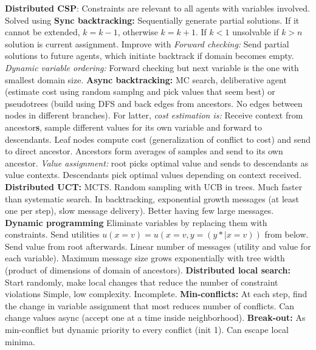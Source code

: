 \documentclass{article}
\newcommand{\disadv}[1]{{\color{red} #1}}
\newcommand{\adv}[1]{{\color{green!60!blue} #1}}
\begin{document}
\begin{multicols*}{4}
\textbf{Distributed CSP}: Constraints are relevant to all agents with variables involved. Solved using \textbf{Sync backtracking: }Sequentially generate partial solutions. If it cannot be extended, $k=k-1$, otherwise $k=k+1$. If $k<1$ unsolvable if $k>n$ solution is current assignment. Improve with \textit{Forward checking: }Send partial solutions to future agents, which initiate backtrack if domain becomes empty. \textit{Dynamic variable ordering: }Forward checking but next variable is the one with smallest domain size. \textbf{Async backtracking: }MC search, deliberative agent (estimate cost using random samplng and pick values that seem best) or pseudotrees (build using DFS and back edges from ancestors. No edges between nodes in different branches). For latter, \textit{cost estimation is: }Receive context from ancestor\textbf{s}, sample different values for its own variable and forward to descendants. Leaf nodes compute cost (generalization of conflict to cost) and send to direct ancestor. Ancestors form averages of samples and send to its own ancestor. \textit{Value assignment: }root picks optimal value and sends to descendants as value contexts. Descendants pick optimal values depending on context received. \textbf{Distributed UCT: }MCTS. Random sampling with UCB in trees. Much faster than systematic search. \disadv{In backtracking, exponential growth messages (at least one per step), slow message delivery}). Better having few large messages. \textbf{Dynamic programming} Eliminate variables by replacing them with constraints. Send utilities $u(x=v)=u(x=v,y=(y*|x=v))$ from below. Send value from root afterwards. \adv{Linear number of messages (utility and value for each variable)}. \disadv{Maximum message size grows exponentially with tree width (product of dimensions of domain of ancestors)}. \textbf{Distributed local search: }Start randomly, make local changes that reduce the number of constraint violations \adv{Simple, low complexity}. \disadv{Incomplete}. \textbf{Min-conflicts: }At each step, find the change in variable assignment that most reduces number of conflicts. Can change values async (accept one at a time inside neighborhood). \textbf{Break-out: }As min-conflict but dynamic priority to every conflict (init 1). \adv{Can escape local minima}.


\end{multicols*}
\end{document}

